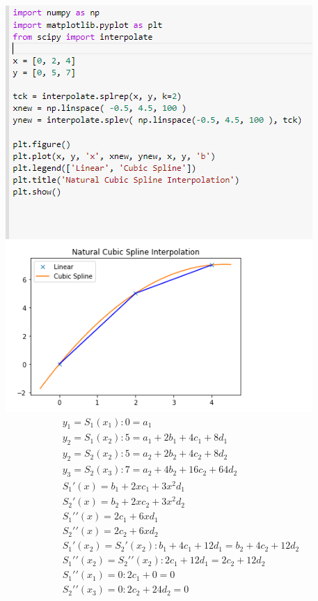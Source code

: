 \documentclass{article}
\begin{document}
\begin{enumerate}[1.]
\includegraphics{a2_q5} \\

\begin{gather} \label{eq:1}
y_1 = S_1(x_1) : 0 = a_1 \\
y_2 = S_1(x_2) : 5 = a_1 + 2b_1 + 4c_1 + 8d_1 \\
y_2 = S_2(x_2) : 5 = a_2 + 2b_2 + 4c_2 + 8d_2 \\
y_3 = S_2(x_3) : 7 = a_2 + 4b_2 + 16c_2 + 64d_2 \\
S_1\prime(x) = b_1 + 2xc_1 + 3x^2d_1 \nonumber \\
S_2\prime(x) = b_2 + 2xc_2 + 3x^2d_2 \nonumber \\
S_1\prime\prime(x) = 2c_1 + 6xd_1 \nonumber \\
S_2\prime\prime(x) = 2c_2 + 6xd_2 \nonumber \\
S_1\prime(x_2)  = S_2\prime(x_2):  b_1 + 4c_1 + 12d_1 = b_2 + 4c_2 + 12d_2\\
S_1\prime\prime(x_2) = S_2\prime\prime(x_2) : 2c_1 + 12d_1 = 2c_2 + 12d_2\\
S_1\prime\prime(x_1) = 0 : 2c_1 + 0 = 0 \\
S_2\prime\prime(x_3) = 0 : 2c_2 + 24d_2 = 0
\end{gather}


\end{enumerate}
\end{document}
